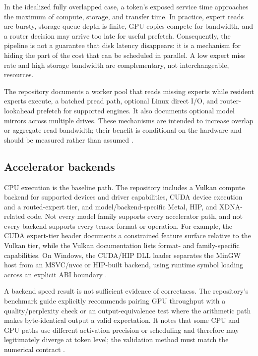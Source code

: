 \documentclass[10pt,twocolumn]{article}
\begin{document}
In the idealized fully overlapped case, a token's exposed service time approaches the maximum of compute, storage, and transfer time. In practice, expert reads are bursty, storage queue depth is finite, GPU copies compete for bandwidth, and a router decision may arrive too late for useful prefetch. Consequently, the pipeline is not a guarantee that disk latency disappears: it is a mechanism for hiding the part of the cost that can be scheduled in parallel. A low expert miss rate and high storage bandwidth are complementary, not interchangeable, resources.

The repository documents a worker pool that reads missing experts while resident experts execute, a batched pread path, optional Linux direct I/O, and router-lookahead prefetch for supported engines. It also documents optional model mirrors across multiple drives. These mechanisms are intended to increase overlap or aggregate read bandwidth; their benefit is conditional on the hardware and should be measured rather than assumed \cite{qoralisreadme,qoralistuning,qoralisbench}.

\subsection{Accelerator backends}
CPU execution is the baseline path. The repository includes a Vulkan compute backend for supported devices and driver capabilities, CUDA device execution and a routed-expert tier, and model/backend-specific Metal, HIP, and XDNA-related code. Not every model family supports every accelerator path, and not every backend supports every tensor format or operation. For example, the CUDA expert-tier header documents a constrained feature surface relative to the Vulkan tier, while the Vulkan documentation lists format- and family-specific capabilities. On Windows, the CUDA/HIP DLL loader separates the MinGW host from an MSVC/nvcc or HIP-built backend, using runtime symbol loading across an explicit ABI boundary \cite{qoralisgpu,qoralisbackendloader,qoralisvulkan}.

A backend speed result is not sufficient evidence of correctness. The repository's benchmark guide explicitly recommends pairing GPU throughput with a quality/perplexity check or an output-equivalence test where the arithmetic path makes byte-identical output a valid expectation. It notes that some CPU and GPU paths use different activation precision or scheduling and therefore may legitimately diverge at token level; the validation method must match the numerical contract \cite{qoralisbench,qoralisvulkan}.
\end{document}

